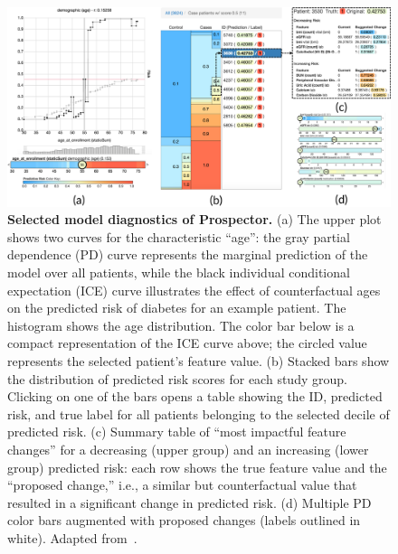 \documentclass[
  oneside]{book}
\begin{document}
\begin{figure}[h]

{\centering \includegraphics[width=1\linewidth]{figures/03-prospector} 

}

\caption{\textbf{Selected model diagnostics of Prospector.} (a) The upper plot shows two curves for the characteristic ``age'': the gray partial dependence (PD) curve represents the marginal prediction of the model over all patients, while the black individual conditional expectation (ICE) curve illustrates the effect of counterfactual ages on the predicted risk of diabetes for an example patient. The histogram shows the age distribution. The color bar below is a compact representation of the ICE curve above; the circled value represents the selected patient's feature value. (b) Stacked bars show the distribution of predicted risk scores for each study group. Clicking on one of the bars opens a table showing the ID, predicted risk, and true label for all patients belonging to the selected decile of predicted risk. (c) Summary table of ``most impactful feature changes'' for a decreasing (upper group) and an increasing (lower group) predicted risk: each row shows the true feature value and the ``proposed change,'' i.e., a similar but counterfactual value that resulted in a significant change in predicted risk. (d) Multiple PD color bars augmented with proposed changes (labels outlined in white). Adapted from~\autocite{Krause:Prospector2016}.}\label{fig:03-prospector}
\end{figure}
\end{document}

